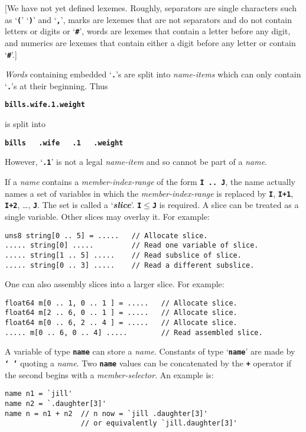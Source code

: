 \documentclass[12pt]{article}
\makeatletter
\newcommand{\TT}[1]{{\tt \bfseries #1}}
\newcommand{\key}[1]{{\bf \em #1}\index{#1}}
\newcommand{\ttkey}[1]{\TT{#1}\index{#1@{\tt #1}}}
\newenvironment{indpar}[1][0.3in]%
	{\begin{list}{}%
		     {\setlength{\itemsep}{0in}%
		      \setlength{\topsep}{0in}%
		      \setlength{\parsep}{1ex}%
		      \setlength{\labelwidth}{#1}%
		      \setlength{\leftmargin}{#1}%
		      \addtolength{\leftmargin}{\labelsep}}%
	 \item}%
	{\end{list}}
\makeatother
\begin{document}
[We have not yet defined lexemes.  Roughly, separators are single
characters such as `\TT{(}' `\TT{)}' and `\TT{,}', marks are lexemes
that are not separators and do not contain letters or digits or `\TT{\#}',
words are lexemes that contain a letter before any digit, and
numerics are lexemes that contain either a digit before any letter
or contain `\TT{\#}'.]

{\em Words} containing embedded `\TT{.}'s are split into
{\em name-items} which can only contain `\TT{.}'s at their beginning.
Thus
\begin{center}
\TT{bills.wife.1.weight}
\end{center}
is split into
\begin{center}
\TT{bills~~~.wife~~~.1~~~.weight}
\end{center}
However, `\TT{.1}' is not a legal {\em name-item} and so cannot
be part of a {\em name}.

If a {\em name} contains a {\em member-index-range} of the form
\TT{I~..~J}, the name actually names a set of variables in which
the {\em member-index-range} is replaced by \TT{I}, \TT{I+1},
\TT{I+2}, \ldots, \TT{J}.  The set is called a `\key{slice}'.\label{SLICE}
\TT{I}$\leq$\TT{J} is required.
A slice can be treated as a single variable.  Other slices may
overlay it.  For example:
\begin{indpar}\begin{verbatim}
uns8 string[0 .. 5] = .....   // Allocate slice.
..... string[0] .....         // Read one variable of slice.
..... string[1 .. 5] .....    // Read subslice of slice.
..... string[0 .. 3] .....    // Read a different subslice.
\end{verbatim}\end{indpar}

One can also assembly slices into a larger slice.  For example:
\begin{indpar}\begin{verbatim}
float64 m[0 .. 1, 0 .. 1 ] = .....   // Allocate slice.
float64 m[2 .. 6, 0 .. 1 ] = .....   // Allocate slice.
float64 m[0 .. 6, 2 .. 4 ] = .....   // Allocate slice.
..... m[0 .. 6, 0 .. 4] .....        // Read assembled slice.
\end{verbatim}\end{indpar}

A variable of type \ttkey{name} can store a {\em name}.
Constants of type `\TT{name}' are made by \TT{`~'} quoting a {\em name}.
Two \TT{name} values can be
concatenated by the \TT{+} operator if the second begins with
a {\em member-selector}.  An
example is:
\begin{indpar}\begin{verbatim}
name n1 = `jill'
name n2 = `.daughter[3]'
name n = n1 + n2  // n now = `jill .daughter[3]'
                  // or equivalently `jill.daughter[3]'
\end{verbatim}\end{indpar}
\end{document}
